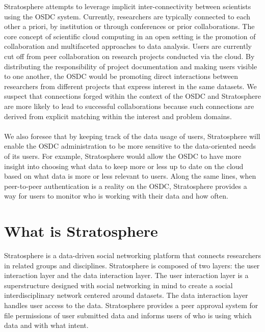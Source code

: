 \begin{multicols*}{2}
Stratosphere attempts to leverage implicit inter-connectivity between
scientists using the OSDC system. Currently, researchers are typically
connected to each other a priori, by institution or through
conferences or prior collaborations. The core concept of scientific
cloud computing in an open setting is the promotion of collaboration
and multifaceted approaches to data analysis. Users are currently cut
off from peer collaboration on research projects conducted via the
cloud. By distributing the responsibility of project documentation and
making users visible to one another, the OSDC would be promoting
direct interactions between researchers from different projects that
express interest in the same datasets. We suspect that connections
forged within the context of the OSDC and Stratosphere are more likely to lead to
successful collaborations because such connections are derived from
explicit matching within the interest and problem domains.
\\
\\
We also foresee that by keeping track of the data usage of users,
Stratosphere will enable the OSDC administration to be more sensitive to the
data-oriented needs of its users. For example, Stratosphere would allow the
OSDC to have more insight into choosing what data to keep more or less
up to date on the cloud based on what data is more or less relevant to users.
Along the same lines, when peer-to-peer authentication is a reality on
the OSDC, Stratosphere provides a way for users to monitor who is
working with their data and how often. 

\section{What is Stratosphere}
\label{sec:what}

Stratosphere is a data-driven social networking platform that connects
researchers in related groups and disciplines. Stratosphere is
composed of two layers: the user interaction layer and the data
interaction layer. The user interaction layer is a superstructure
designed with social networking in mind to create a social
interdisciplinary network centered around datasets. The data
interaction layer handles user access to the data. Stratosphere
provides a peer approval system for file permissions of user submitted
data and informs users of who is using which data and with what
intent.




\end{multicols*}
